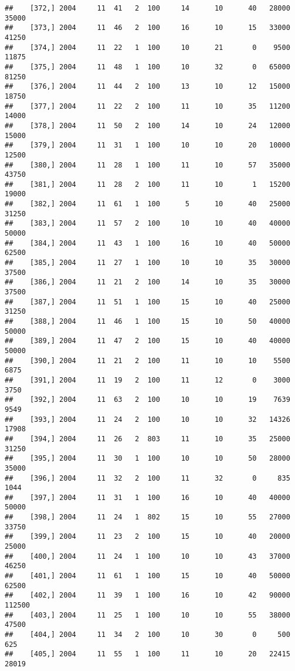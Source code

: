 \documentclass{article}\usepackage[]{graphicx}\usepackage[]{color}
\makeatletter
\newenvironment{kframe}{%
 \def\at@end@of@kframe{}%
 \ifinner\ifhmode%
  \def\at@end@of@kframe{\end{minipage}}%
  \begin{minipage}{\columnwidth}%
 \fi\fi%
 \def\FrameCommand##1{\hskip\@totalleftmargin \hskip-\fboxsep
 \colorbox{shadecolor}{##1}\hskip-\fboxsep
     \hskip-\linewidth \hskip-\@totalleftmargin \hskip\columnwidth}%
 \MakeFramed {\advance\hsize-\width
   \@totalleftmargin\z@ \linewidth\hsize
   \@setminipage}}%
 {\par\unskip\endMakeFramed%
 \at@end@of@kframe}
\newenvironment{knitrout}{}{} %
\makeatother
\begin{document}
\begin{knitrout}
\begin{kframe}
\begin{verbatim}
##    [372,] 2004     11  41   2  100     14      10      40   28000   35000
##    [373,] 2004     11  46   2  100     16      10      15   33000   41250
##    [374,] 2004     11  22   1  100     10      21       0    9500   11875
##    [375,] 2004     11  48   1  100     10      32       0   65000   81250
##    [376,] 2004     11  44   2  100     13      10      12   15000   18750
##    [377,] 2004     11  22   2  100     11      10      35   11200   14000
##    [378,] 2004     11  50   2  100     14      10      24   12000   15000
##    [379,] 2004     11  31   1  100     10      10      20   10000   12500
##    [380,] 2004     11  28   1  100     11      10      57   35000   43750
##    [381,] 2004     11  28   2  100     11      10       1   15200   19000
##    [382,] 2004     11  61   1  100      5      10      40   25000   31250
##    [383,] 2004     11  57   2  100     10      10      40   40000   50000
##    [384,] 2004     11  43   1  100     16      10      40   50000   62500
##    [385,] 2004     11  27   1  100     10      10      35   30000   37500
##    [386,] 2004     11  21   2  100     14      10      35   30000   37500
##    [387,] 2004     11  51   1  100     15      10      40   25000   31250
##    [388,] 2004     11  46   1  100     15      10      50   40000   50000
##    [389,] 2004     11  47   2  100     15      10      40   40000   50000
##    [390,] 2004     11  21   2  100     11      10      10    5500    6875
##    [391,] 2004     11  19   2  100     11      12       0    3000    3750
##    [392,] 2004     11  63   2  100     10      10      19    7639    9549
##    [393,] 2004     11  24   2  100     10      10      32   14326   17908
##    [394,] 2004     11  26   2  803     11      10      35   25000   31250
##    [395,] 2004     11  30   1  100     10      10      50   28000   35000
##    [396,] 2004     11  32   2  100     11      32       0     835    1044
##    [397,] 2004     11  31   1  100     16      10      40   40000   50000
##    [398,] 2004     11  24   1  802     15      10      55   27000   33750
##    [399,] 2004     11  23   2  100     15      10      40   20000   25000
##    [400,] 2004     11  24   1  100     10      10      43   37000   46250
##    [401,] 2004     11  61   1  100     15      10      40   50000   62500
##    [402,] 2004     11  39   1  100     16      10      42   90000  112500
##    [403,] 2004     11  25   1  100     10      10      55   38000   47500
##    [404,] 2004     11  34   2  100     10      30       0     500     625
##    [405,] 2004     11  55   1  100     11      10      20   22415   28019

\end{verbatim}
\end{kframe}
\end{knitrout}
\end{document}
